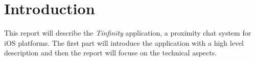\section{Introduction}
This report will describe the \emph{Tinfinity} application, a proximity chat system for iOS platforms. The first part will introduce the application with a high level description and then the report will focuse on the technical aspects.